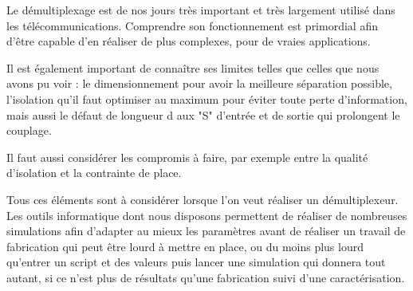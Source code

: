 \documentclass[a4paper,11pt]{report}
\begin{document}
Le démultiplexage est de nos jours très important et très largement utilisé dans les télécommunications. Comprendre son fonctionnement est primordial afin d'être capable d'en réaliser de plus complexes, pour de vraies applications.

Il est également important de connaître ses limites telles que celles que nous avons pu voir : le dimensionnement pour avoir la meilleure séparation possible, l'isolation qu'il faut optimiser au maximum pour éviter toute perte d'information, mais aussi le défaut de longueur d aux "S" d'entrée et de sortie qui prolongent le couplage.

Il faut aussi considérer les compromis à faire, par exemple entre la qualité d'isolation et la contrainte de place.

Tous ces éléments sont à considérer lorsque l'on veut réaliser un démultiplexeur. Les outils informatique dont nous disposons permettent de réaliser de nombreuses simulations afin d'adapter au mieux les paramètres avant de réaliser un travail de fabrication qui peut être lourd à mettre en place, ou du moins plus lourd qu'entrer un script et des valeurs puis lancer une simulation qui donnera tout autant, si ce n'est plus de résultats qu'une fabrication suivi d'une caractérisation.

\nocite{*}


\end{document}
